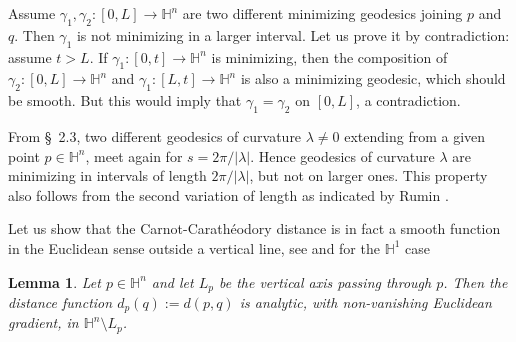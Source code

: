 \documentclass[10pt]{amsart}
\newtheorem{lemma}[theorem]{Lemma}
\theoremstyle{definition}
\theoremstyle{remark}
\numberwithin{equation}{section}
\begin{document}
Assume ${\gamma}_{1}, {\gamma}_{2}:[0,L]\to{{\mathbb{H}}}^n$ are two different minimizing
geodesics joining $p$ and $q$.  Then ${\gamma}_{1}$ is not minimizing in a
larger interval.  Let us prove it by contradiction: assume $t>L$.  If
${\gamma}_{1}:[0,t]\to{{\mathbb{H}}}^n$ is minimizing, then the composition of
${\gamma}_{2}:[0,L]\to{{\mathbb{H}}}^n$ and ${\gamma}_{1}:[L,t]\to{{\mathbb{H}}}^n$ is also a
minimizing geodesic, which should be smooth. But this would imply that
${\gamma}_{1}={\gamma}_{2}$ on $[0,L]$, a contradiction.

From \S~2.3, two different geodesics of curvature ${\lambda}\neq 0$ 
extending from a given point $p\in{{\mathbb{H}}}^n$, meet again for
$s=2\pi/|{\lambda}|$. Hence geodesics of curvature ${\lambda}$ are minimizing in
intervals of length $2\pi/|{\lambda}|$, but not on larger ones. This property also follows from the second variation of length as indicated by Rumin \cite[p.~327]{MR1267892}. 

Let us show that the Carnot-Carath\'eodory distance is in fact a
smooth function in the Euclidean sense outside a vertical line, see \cite{MR2035027} and \cite{MR1976833} for the ${{\mathbb{H}}}^1$ case

\begin{lemma}
Let $p\in{{\mathbb{H}}}^n$ and let $L_{p}$ be the vertical axis passing through
$p$.  Then the distance function $d_{p}(q):=d(p,q)$ is analytic,
with non-vanishing Euclidean gradient, in ${{\mathbb{H}}}^n\setminus L_{p}$.
\end{lemma}
\end{document}
